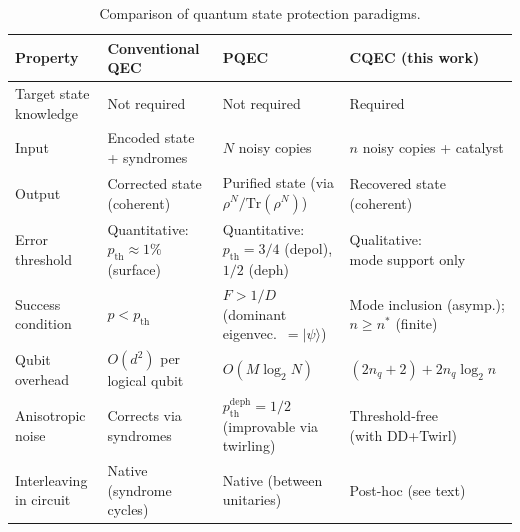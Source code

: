 \documentclass[a4paper,twocolumn]{quantumarticle}
\newenvironment{ruledtabular}{}{}%
\providecommand{\colrule}{\hline}
\begin{document}
\begin{table}[t]
\caption{Comparison of quantum state protection paradigms.}
\label{tab:paradigms}
\centering\footnotesize
\setlength{\tabcolsep}{4pt}
\begin{ruledtabular}
\begin{tabular}{llll}
Property & Conventional QEC & PQEC~\cite{Raghoonanan2026} & CQEC (this work) \\
\colrule
Target state knowledge & Not required & Not required & Required \\
Input & \makecell[l]{Encoded state\\+ syndromes} & $N$ noisy copies & \makecell[l]{$n$ noisy copies\\+ catalyst} \\
Output & \makecell[l]{Corrected state\\(coherent)} & \makecell[l]{Purified state\\(via $\rho^N/\mathrm{Tr}(\rho^N)$)} & \makecell[l]{Recovered state\\(coherent)} \\
Error threshold & \makecell[l]{Quantitative:\\$p_\mathrm{th} \approx 1\%$ (surface)} & \makecell[l]{Quantitative: $p_\mathrm{th} = 3/4$\\(depol), $1/2$ (deph)} & \makecell[l]{Qualitative:\\mode support only} \\
Success condition & $p < p_\mathrm{th}$ & \makecell[l]{$F > 1/D$ (dominant\\eigenvec.\ $= |\psi\rangle$)} & \makecell[l]{Mode inclusion (asymp.);\\$n \geq n^*$ (finite)} \\
Qubit overhead & $O(d^2)$ per logical qubit & $O(M \log_2 N)$ & $(2n_q{+}2) + 2n_q \log_2 n$ \\
Anisotropic noise & Corrects via syndromes & \makecell[l]{$p_\mathrm{th}^{\mathrm{deph}} = 1/2$\\(improvable via twirling)} & \makecell[l]{Threshold-free\\(with DD+Twirl)} \\
Interleaving in circuit & Native (syndrome cycles) & Native (between unitaries) & Post-hoc (see text) \\
\end{tabular}
\end{ruledtabular}
\end{table}
\end{document}
